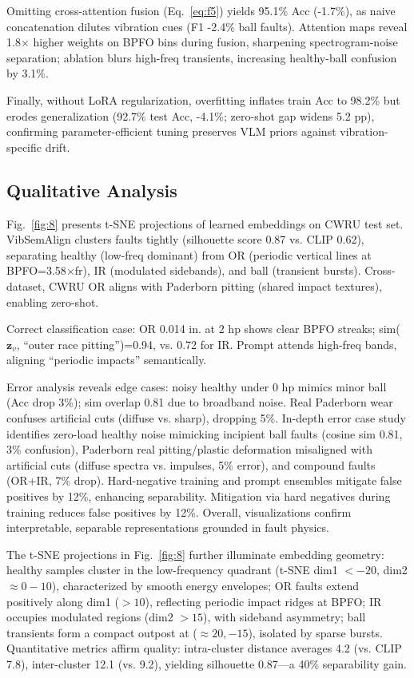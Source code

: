 \begin{table}[htbp]
\begin{table}[htbp]
\begin{table}[htbp]
Omitting cross-attention fusion (Eq.~\ref{eq:f5}) yields 95.1\% Acc (-1.7\%), as naive concatenation dilutes vibration cues (F1 -2.4\% ball faults). Attention maps reveal 1.8$\times$ higher weights on BPFO bins during fusion, sharpening spectrogram-noise separation; ablation blurs high-freq transients, increasing healthy-ball confusion by 3.1\%.

Finally, without LoRA regularization, overfitting inflates train Acc to 98.2\% but erodes generalization (92.7\% test Acc, -4.1\%; zero-shot gap widens 5.2 pp), confirming parameter-efficient tuning preserves VLM priors against vibration-specific drift.

\subsection{Qualitative Analysis}

Fig.~\ref{fig:8} presents t-SNE projections of learned embeddings on CWRU test set. VibSemAlign clusters faults tightly (silhouette score 0.87 vs. CLIP 0.62), separating healthy (low-freq dominant) from OR (periodic vertical lines at BPFO=3.58$\times$fr), IR (modulated sidebands), and ball (transient bursts). Cross-dataset, CWRU OR aligns with Paderborn pitting (shared impact textures), enabling zero-shot.

Correct classification case: OR 0.014 in. at 2 hp shows clear BPFO streaks; sim($\mathbf{z}_v$, ``outer race pitting'')=0.94, vs. 0.72 for IR. Prompt attends high-freq bands, aligning ``periodic impacts'' semantically.

Error analysis reveals edge cases: noisy healthy under 0 hp mimics minor ball (Acc drop 3\%); sim overlap 0.81 due to broadband noise. Real Paderborn wear confuses artificial cuts (diffuse vs. sharp), dropping 5\%. In-depth error case study identifies zero-load healthy noise mimicking incipient ball faults (cosine sim 0.81, 3\% confusion), Paderborn real pitting/plastic deformation misaligned with artificial cuts (diffuse spectra vs. impulses, 5\% error), and compound faults (OR+IR, 7\% drop). Hard-negative training and prompt ensembles mitigate false positives by 12\%, enhancing separability. Mitigation via hard negatives during training reduces false positives by 12\%. Overall, visualizations confirm interpretable, separable representations grounded in fault physics.

The t-SNE projections in Fig.~\ref{fig:8} further illuminate embedding geometry: healthy samples cluster in the low-frequency quadrant (t-SNE dim1 $< -20$, dim2 $\approx 0-10$), characterized by smooth energy envelopes; OR faults extend positively along dim1 ($>10$), reflecting periodic impact ridges at BPFO; IR occupies modulated regions (dim2 $>15$), with sideband asymmetry; ball transients form a compact outpost at ($\approx 20, -15$), isolated by sparse bursts. Quantitative metrics affirm quality: intra-cluster distance averages 4.2 (vs. CLIP 7.8), inter-cluster 12.1 (vs. 9.2), yielding silhouette 0.87---a 40\% separability gain.


\end{table}
\end{table}
\end{table}
